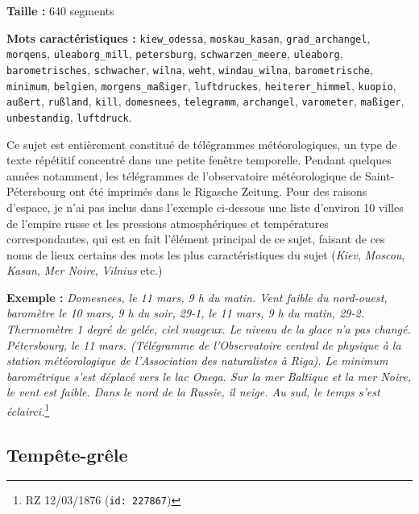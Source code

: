 \documentclass[a4paper,twoside,12pt]{article}
\begin{document}
\begin{flushleft}
\textbf{Taille :} 640 segments

\textbf{Mots caractéristiques :} \texttt{kiew\_odessa}, \texttt{moskau\_kasan}, \texttt{grad\_archangel}, \texttt{morqens}, \texttt{uleaborg\_mill}, \texttt{petersburg}, \texttt{schwarzen\_meere}, \texttt{uleaborg}, \texttt{barometrisches}, \texttt{schwacher}, \texttt{wilna}, \texttt{weht}, \texttt{windau\_wilna}, \texttt{barometrische}, \texttt{minimum}, \texttt{belgien}, \texttt{morgens\_maßiger}, \texttt{luftdruckes}, \texttt{heiterer\_himmel}, \texttt{kuopio}, \texttt{außert}, \texttt{rußland}, \texttt{kill}, \texttt{domesnees}, \texttt{telegramm}, \texttt{archangel}, \texttt{varometer}, \texttt{maßiger}, \texttt{unbestandig}, \texttt{luftdruck}.
\end{flushleft}

\noindent Ce sujet est entièrement constitué de télégrammes météorologiques, un type de texte répétitif concentré dans une petite fenêtre temporelle. Pendant quelques années notamment, les télégrammes de l'observatoire météorologique de Saint-Pétersbourg ont été imprimés dans le Rigasche Zeitung. Pour des raisons d'espace, je n'ai pas inclus dans l'exemple ci-dessous une liste d'environ 10 villes de l'empire russe et les pressions atmosphériques et températures correspondantes, qui est en fait l'élément principal de ce sujet, faisant de ces noms de lieux certains des mots les plus caractéristiques du sujet (\textit{Kiev}, \textit{Moscou}, \textit{Kasan}, \textit{Mer Noire}, \textit{Vilnius} etc.)

\medskip

\noindent \textbf{Exemple :} \textit{Domesnees, le 11 mars, 9 h du matin. Vent faible du nord-ouest, baromètre le 10 mars, 9 h du soir, 29-1, le 11 mars, 9 h du matin, 29-2. Thermomètre 1 degré de gelée, ciel nuageux. Le niveau de la glace n'a pas changé. Pétersbourg, le 11 mars. (Télégramme de l'Observatoire central de physique à la station météorologique de l'Association des naturalistes à Riga). Le minimum barométrique s'est déplacé vers le lac Onega. Sur la mer Baltique et la mer Noire, le vent est faible. Dans le nord de la Russie, il neige. Au sud, le temps s'est éclairci.}\footnote{RZ 12/03/1876 (\texttt{id: 227867})}

\clearpage


\subsection{Tempête-grêle} \label{topic12_tempête-grêle}
\end{document}
